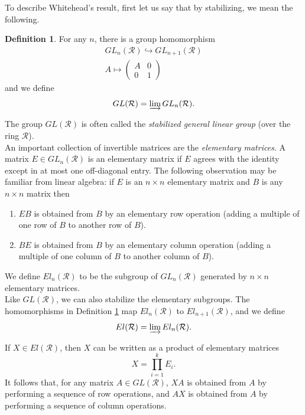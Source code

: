 \documentclass{amsart}
\theoremstyle{definition}
\newtheorem{de}[equation]{Definition}
\theoremstyle{definition}
\newcommand{\calR}{\mathcal{R}}
\numberwithin{equation}{subsection}
\begin{document}
To describe Whitehead's result, first let us say that by stabilizing, we mean the following.
\begin{de}\label{def:stabilization}
For any $n$, there is a group homomorphism
\begin{gather*}
GL_{n}(\calR) \hookrightarrow GL_{n+1}(\calR)\\
A \mapsto \begin{pmatrix} A & 0 \\ 0 & 1 \end{pmatrix}
\end{gather*}
and we define
$$GL(\calR) = \varinjlim GL_{n}(\calR).$$
\end{de}

The group $GL(\calR)$ is often called the {\it stabilized general linear group} (over the ring $\calR$).\\

An important collection of invertible matrices are the {\it elementary matrices}. A matrix $E \in GL_{n}(\calR)$ is an elementary matrix if $E$ agrees with the identity except in at most one off-diagonal entry. The following observation may be familiar from linear algebra: if $E$ is an $n \times n$ elementary matrix and $B$ is any $n \times n$ matrix then
\begin{enumerate}
\item
$EB$ is obtained from $B$ by an elementary row operation (adding a multiple of one row of $B$ to another row of $B$).
\item
$BE$ is obtained from $B$ by an elementary column operation (adding a multiple of one column of $B$ to another column of $B$).
\end{enumerate}

We define $El_{n}(\calR)$ to be the subgroup of $GL_{n}(\calR)$ generated by $n \times n$ elementary matrices.\\

Like $GL(\calR)$, we can also stabilize the elementary subgroups. The homomorphisms in Definition \ref{def:stabilization} map $El_{n}(\calR)$ to $El_{n+1}(\calR)$, and we define
$$El(\calR) = \varinjlim El_{n}(\calR).$$

If $X \in El(\calR)$, then $X$ can be written as a product of elementary matrices
$$X = \prod_{i=1}^{k}E_{i}.$$
It follows that, for any matrix $A \in GL(\calR)$, $XA$ is obtained from $A$ by performing a sequence of row operations, and $AX$ is obtained from $A$ by performing a sequence of column operations.\\
\end{document}
